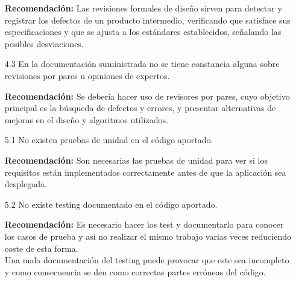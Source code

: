 \documentclass[a4paper,12pt]{report}
\begin{document}
\begin{enumerate}
    \vspace{0.05cm}
    \newpage
    \textbf{Recomendación:} Las revisiones formales de diseño sirven para detectar y registrar los 
    defectos de un producto intermedio, verificando que satisface sus especificaciones y que se ajusta
    a los estándares establecidos, señalando las posibles desviaciones.\\
    
    \vspace{0.05cm}
    
    \item[4.3] En la documentación suministrada no se tiene constancia
    alguna sobre revisiones por pares u opiniones de expertos. \\
    
    \vspace{0.05cm}
    
        \textbf{Recomendación:} Se debería hacer uso de revisores por
        pares, cuyo objetivo principal es la búsqueda de defectos y
        errores, y presentar alternativas de mejoras en el diseño y
        algoritmos utilizados.\\
        
        \vspace{0.05cm}
    
    \item[5.1] No existen pruebas de unidad en el código aportado.\\
    \vspace{0.05cm}
    
    \textbf{Recomendación:} Son necesarias las pruebas de unidad para ver si los requisitos están implementados correctamente antes de que la aplicación sea desplegada.
    
    \item[5.2] No existe testing documentado en el código aportado.\\
    
    \vspace{0.05cm}
    
    \textbf{Recomendación:} Es necesario hacer los test y documentarlo para conocer los casos de prueba y así no realizar el mismo trabajo varias veces reduciendo coste de esta forma.\\
    
    Una mala documentación del testing puede provocar que este sea incompleto y como consecuencia se den como correctas partes erróneas del código.\\
    

\end{enumerate}
\end{document}
